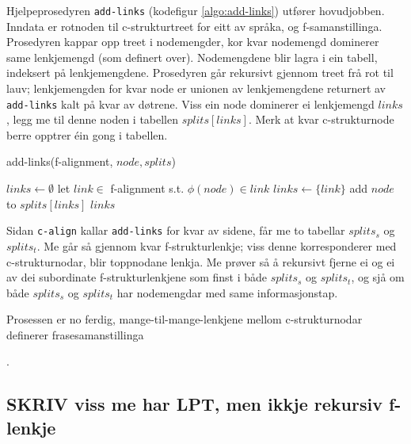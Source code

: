\documentclass[11pt,a4paper,oneside,draft]{book}
\begin{document}
Hjelpeprosedyren \texttt{add-links} (kodefigur \ref{algo:add-links}) utfører
hovudjobben. Inndata er rotnoden til c-strukturtreet for eitt av
språka, og f-samanstillinga. Prosedyren kappar opp treet i
nodemengder, kor kvar nodemengd dominerer same lenkjemengd (som
definert over).  Nodemengdene blir lagra i ein tabell, indeksert på
lenkjemengdene. Prosedyren går rekursivt gjennom treet frå rot til
lauv; lenkjemengden for kvar node er unionen av lenkjemengdene
returnert av \texttt{add-links} kalt på kvar av døtrene. Viss ein node
dominerer ei lenkjemengd $links$, legg me til denne noden i tabellen
$splits[links]$. Merk at kvar c-strukturnode berre opptrer éin gong i
tabellen.

   \begin{algorithm}[]
   \caption{add-links(f-alignment, $node, splits$)}
   \label{algo:add-links}
      
        $links \gets \emptyset$\;
    {
        {
          let $link \in$ f-alignment s.t. $\phi(node) \in link$ \;
           {$links \gets \{link\}$}
        }
        add $node$ to $splits[links]$ \;
       }
        \Return $links$ \;
  \end{algorithm}

Sidan \texttt{c-align} kallar \texttt{add-links} for kvar av sidene, får me to
tabellar $splits_s$ og $splits_t$. Me går så gjennom kvar
f-strukturlenkje; viss denne korresponderer med c-strukturnodar, blir
toppnodane lenkja. Me prøver så å rekursivt fjerne ei og ei av dei subordinate
f-strukturlenkjene som finst i både $splits_s$ og $splits_t$, og sjå
om både $splits_s$ og $splits_t$ har nodemengdar med same
informasjonstap.


Prosessen er no ferdig, mange-til-mange-lenkjene mellom
c-strukturnodar definerer frasesamanstillinga

.


\subsection{\textbf{SKRIV} viss me har LPT, men ikkje rekursiv f-lenkje}
\label{sec-4.3.1}
\end{document}
